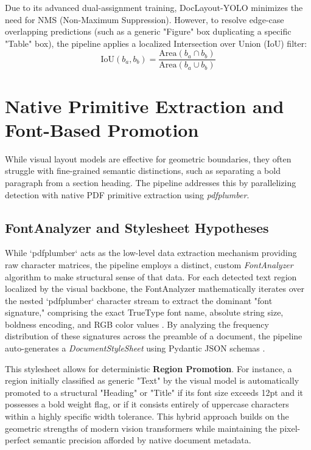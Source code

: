 Due to its advanced dual-assignment training, DocLayout-YOLO minimizes the need for NMS (Non-Maximum Suppression). However, to resolve edge-case overlapping predictions (such as a generic "Figure" box duplicating a specific "Table" box), the pipeline applies a localized Intersection over Union (IoU) filter:
\begin{equation}
\text{IoU}(b_a, b_b) = \frac{\text{Area}(b_a \cap b_b)}{\text{Area}(b_a \cup b_b)}
\end{equation}

\section{Native Primitive Extraction and Font-Based Promotion}
\label{sec:font_analyzer}

While visual layout models are effective for geometric boundaries, they often struggle with fine-grained semantic distinctions, such as separating a bold paragraph from a section heading. The pipeline addresses this by parallelizing detection with native PDF primitive extraction using \textit{pdfplumber}.

\subsection{FontAnalyzer and Stylesheet Hypotheses}
While `pdfplumber` acts as the low-level data extraction mechanism providing raw character matrices, the pipeline employs a distinct, custom \textit{FontAnalyzer} algorithm to make structural sense of that data. For each detected text region localized by the visual backbone, the FontAnalyzer mathematically iterates over the nested `pdfplumber` character stream to extract the dominant "font signature," comprising the exact TrueType font name, absolute string size, boldness encoding, and RGB color values \citep{pdfplumber}. By analyzing the frequency distribution of these signatures across the preamble of a document, the pipeline auto-generates a \textit{DocumentStyleSheet} using Pydantic JSON schemas \citep{pydantic}. 

This stylesheet allows for deterministic \textbf{Region Promotion}. For instance, a region initially classified as generic "Text" by the visual model is automatically promoted to a structural "Heading" or "Title" if its font size exceeds 12pt and it possesses a bold weight flag, or if it consists entirely of uppercase characters within a highly specific width tolerance. This hybrid approach builds on the geometric strengths of modern vision transformers \citep{vit} while maintaining the pixel-perfect semantic precision afforded by native document metadata.

